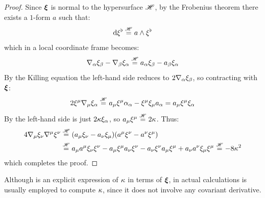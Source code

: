 \begin{proofbox}
  \begin{proof}
    Since $ \boldsymbol{\xi} $ is normal to the hypersurface $ \mathscr{H} $, by the Frobenius theorem there exists a $ 1 $-form $ a $ such that:
    \begin{equation*}
      \mathrm{d} \xi^\flat \overset{\mathscr{H}}{=} a \wedge \xi^\flat
    \end{equation*}
    which in a local coordinate frame becomes:
    \begin{equation*}
      \nabla_\alpha \xi_\beta - \nabla_\beta \xi_\alpha \overset{\mathscr{H}}{=} a_\alpha \xi_\beta - a_\beta \xi_\alpha
    \end{equation*}
    By the Killing equation  the left-hand side reduces to $ 2 \nabla_\alpha \xi_\beta $, so contracting with $ \boldsymbol{\xi} $:
    \begin{equation*}
      2 \xi^\mu \nabla_\mu \xi_\alpha \overset{\mathscr{H}}{=} a_\mu \xi^\mu \alpha_\alpha - \xi^\mu \xi_\mu a_\alpha = a_\mu \xi^\mu \xi_\alpha
    \end{equation*}
    By  the left-hand side is just $ 2 \kappa \xi_\alpha $, so $ a_\mu \xi^\mu \overset{\mathscr{H}}{=} 2 \kappa $. Thus:
    \begin{equation*}
      \begin{split}
        4 \nabla_\mu \xi_\nu \nabla^\mu \xi^\nu
        & \overset{\mathscr{H}}{=} (a_\mu \xi_\nu - a_\nu \xi_\mu) (a^\mu \xi^\nu - a^\nu \xi^\mu) \\
        & \overset{\mathscr{H}}{=} a_\mu a^\mu \xi_\nu \xi^\nu - a_\mu \xi^\mu a_\nu \xi^\nu - a_\nu \xi^\nu a_\mu \xi^\mu + a_\nu a^\nu \xi_\mu \xi^\mu \overset{\mathscr{H}}{=} - 8 \kappa^2
      \end{split}
    \end{equation*}
    which completes the proof.
  \end{proof}
\end{proofbox}

Although  is an explicit expression of $ \kappa $ in terms of $ \boldsymbol{\xi} $, in actual calculations  is usually employed to compute $ \kappa $, since it does not involve any covariant derivative.

